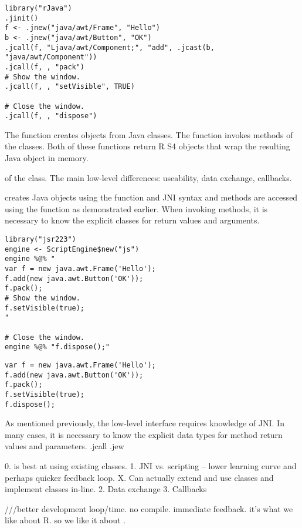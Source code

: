 \begin{verbatim}
library("rJava")
.jinit()
f <- .jnew("java/awt/Frame", "Hello")
b <- .jnew("java/awt/Button", "OK")
.jcall(f, "Ljava/awt/Component;", "add", .jcast(b, "java/awt/Component"))
.jcall(f, , "pack")
# Show the window.
.jcall(f, , "setVisible", TRUE)

# Close the window.
.jcall(f, , "dispose")
\end{verbatim}

The  function  creates objects from Java classes. The  function invokes methods of the classes. Both of these functions return R S4 objects that wrap the resulting Java object in memory.

 of the  class. 
The main low-level differences: useability, data exchange, callbacks.




 creates Java objects using the  function and JNI syntax and methods are accessed using the  function as demonstrated earlier. When invoking methods, it is necessary to know the explicit classes for return values and arguments.

\begin{verbatim}
library("jsr223")
engine <- ScriptEngine$new("js")
engine %@% "
var f = new java.awt.Frame('Hello');
f.add(new java.awt.Button('OK'));
f.pack();
# Show the window.
f.setVisible(true);
"

# Close the window.
engine %@% "f.dispose();"
\end{verbatim}

\begin{verbatim}
var f = new java.awt.Frame('Hello');
f.add(new java.awt.Button('OK'));
f.pack();
f.setVisible(true);
f.dispose();
\end{verbatim}



As mentioned previously, the  low-level interface requires knowledge of JNI. In many cases, it is necessary to know the explicit data types for method return values and parameters.
.jcall
.jew




0.  is best at using existing classes.
1. JNI vs. scripting -- lower learning curve and perhaps quicker feedback loop.
X. Can actually extend and use classes and implement classes in-line.
2. Data exchange
3. Callbacks


///better development loop/time. no compile. immediate feedback. it's what we like about R. so we like it about .

